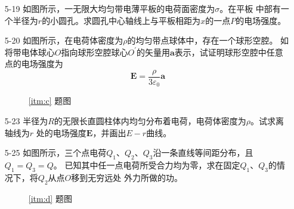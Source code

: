 \documentclass[UTF-8]{ctexart}
\makeatletter
\newcommand\mlabel[2]{#2\def\@currentlabel{#2}\label{#1}}
\makeatother
\begin{document}
\begin{enumerate}
    \item[\mlabel{itm:b}{5-19}] 如图所示，一无限大均匀带电薄平板的电荷面密度为\(\sigma\)。在平板
        中部有一个半径为\(r\)的小圆孔。求圆孔中心轴线上与平板相距为\(x\)的一点\(P\)的电场强度。

    \item[\mlabel{itm:c}{5-20}] 如图所示，在电荷体密度为\(\rho\)的均匀带点球体中，存在一个球形空腔。
        如将带电体球心\(O\)指向球形空腔球心\(O^\prime\)的矢量用\(\bm{a}\)表示，试证明球形空腔中任意
        点的电场强度为
        \[
            \bm{E}=\frac{\rho}{3\varepsilon_0}\bm{a}
        \]
        \begin{figure}[htbp]
            \centering
            \begin{minipage}[b]{.4\textwidth}
                \centering
                \caption{\ref{itm:c} 题图}
            \end{minipage}
        \end{figure} 

    \item[5-23] 半径为\(R\)的无限长直圆柱体内均匀分布着电荷，电荷体密度为\(\rho\)。试求离轴线为\(r\)
        处的电场强度\(\bm{E}\)，并画出\(E-r\)曲线。

    \item[\mlabel{itm:d}{5-25}] 如图所示，三个点电荷\(Q_1\)、\(Q_2\)、\(Q_3\)沿一条直线等间距分布，且\(Q_1=Q_3=Q\)。
        已知其中任一点电荷所受合力均为零，求在固定\(Q_1\)、\(Q_3\)的情况下，将\(Q_2\)从点\(O\)移到无穷远处
        外力所做的功。
        \begin{figure}[htbp]
            \centering
            \begin{minipage}[b]{.4\textwidth}
                \centering
                \caption{\ref{itm:d} 题图}
            \end{minipage}
        \end{figure} 
        

\end{enumerate}
\end{document}
